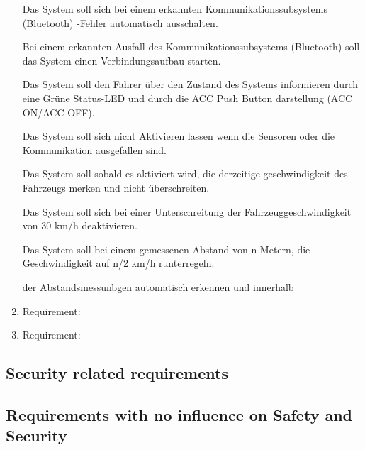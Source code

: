 \begin{enumerate}[label*=\arabic*.]
Das System soll sich bei einem erkannten Kommunikationssubsystems (Bluetooth) -Fehler automatisch ausschalten.

Bei einem erkannten Ausfall des Kommunikationssubsystems (Bluetooth) soll das System einen Verbindungsaufbau starten.

Das System soll den Fahrer über den Zustand des Systems informieren durch eine Grüne Status-LED und durch die ACC Push Button darstellung (ACC ON/ACC OFF).

Das System soll sich nicht Aktivieren lassen wenn die Sensoren oder die Kommunikation ausgefallen sind.

Das System soll sobald es aktiviert wird, die derzeitige geschwindigkeit des Fahrzeugs merken und nicht überschreiten.

Das System soll sich bei einer Unterschreitung der Fahrzeuggeschwindigkeit von 30 km/h deaktivieren.

Das System soll bei einem gemessenen Abstand von n Metern, die Geschwindigkeit auf n/2 km/h runterregeln.








der Abstandsmessunbgen automatisch erkennen und innerhalb 

        
	 	\item \label{req.2} Requirement:   \\
	 	\item \label{req.3} Requirement:   
	 \end{enumerate}

\subsection{Security related requirements}


\subsection{Requirements with no influence on Safety and Security}
